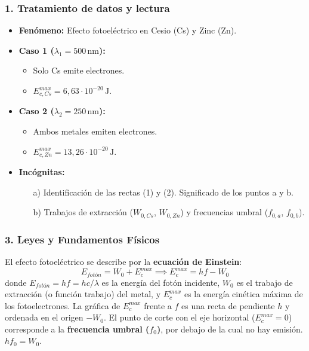 \subsubsection*{1. Tratamiento de datos y lectura}
\begin{itemize}
    \item \textbf{Fenómeno:} Efecto fotoeléctrico en Cesio (Cs) y Zinc (Zn).
    \item \textbf{Caso 1 ($\lambda_1 = 500\,\text{nm}$):}
    \begin{itemize}
        \item Solo Cs emite electrones.
        \item $E_{c, Cs}^{max} = 6,63\cdot10^{-20}\,\text{J}$.
    \end{itemize}
    \item \textbf{Caso 2 ($\lambda_2 = 250\,\text{nm}$):}
    \begin{itemize}
        \item Ambos metales emiten electrones.
        \item $E_{c, Zn}^{max} = 13,26\cdot10^{-20}\,\text{J}$.
    \end{itemize}
    \item \textbf{Incógnitas:}
    \begin{itemize}
        \item[a)] Identificación de las rectas (1) y (2). Significado de los puntos a y b.
        \item[b)] Trabajos de extracción ($W_{0,Cs}$, $W_{0,Zn}$) y frecuencias umbral ($f_{0,a}$, $f_{0,b}$).
    \end{itemize}
\end{itemize}

\subsubsection*{3. Leyes y Fundamentos Físicos}
El efecto fotoeléctrico se describe por la \textbf{ecuación de Einstein}:
$$ E_{fotón} = W_0 + E_c^{max} \implies E_c^{max} = hf - W_0 $$
donde $E_{fotón}=hf=hc/\lambda$ es la energía del fotón incidente, $W_0$ es el trabajo de extracción (o función trabajo) del metal, y $E_c^{max}$ es la energía cinética máxima de los fotoelectrones.
La gráfica de $E_c^{max}$ frente a $f$ es una recta de pendiente $h$ y ordenada en el origen $-W_0$. El punto de corte con el eje horizontal ($E_c^{max}=0$) corresponde a la \textbf{frecuencia umbral ($f_0$)}, por debajo de la cual no hay emisión. $hf_0 = W_0$.

